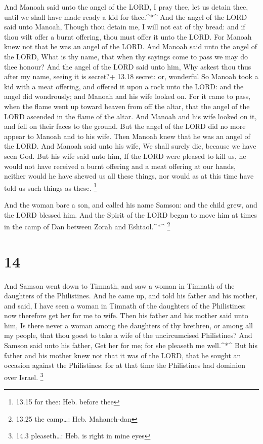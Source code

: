  And Manoah said unto the angel of the LORD, I pray thee,
let us detain thee, until we shall have made ready a kid for
thee.\^{}*\^{}  And the angel of the LORD said unto Manoah,
Though thou detain me, I will not eat of thy bread: and if thou wilt
offer a burnt offering, thou must offer it unto the LORD. For Manoah
knew not that he was an angel of the LORD.  And Manoah said
unto the angel of the LORD, What is thy name, that when thy sayings come
to pass we may do thee honour?  And the angel of the LORD
said unto him, Why askest thou thus after my name, seeing it is secret?+
13.18 secret: or, wonderful  So Manoah took a kid with a
meat offering, and offered it upon a rock unto the LORD: and the angel
did wondrously; and Manoah and his wife looked on.  For it
came to pass, when the flame went up toward heaven from off the altar,
that the angel of the LORD ascended in the flame of the altar. And
Manoah and his wife looked on it, and fell on their faces to the ground.
 But the angel of the LORD did no more appear to Manoah and
to his wife. Then Manoah knew that he was an angel of the LORD.
 And Manoah said unto his wife, We shall surely die,
because we have seen God.  But his wife said unto him, If
the LORD were pleased to kill us, he would not have received a burnt
offering and a meat offering at our hands, neither would he have shewed
us all these things, nor would as at this time have told us such things
as these. \footnote{13.15 for thee: Heb. before thee}

 And the woman bare a son, and called his name Samson: and
the child grew, and the LORD blessed him.  And the Spirit
of the LORD began to move him at times in the camp of Dan between Zorah
and Eshtaol.\^{}*\^{} \footnote{13.25 the camp\ldots: Heb. Mahaneh-dan}

\hypertarget{section-13}{%
\section{14}\label{section-13}}

 And Samson went down to Timnath, and saw a woman in Timnath
of the daughters of the Philistines.  And he came up, and
told his father and his mother, and said, I have seen a woman in Timnath
of the daughters of the Philistines: now therefore get her for me to
wife.  Then his father and his mother said unto him, Is
there never a woman among the daughters of thy brethren, or among all my
people, that thou goest to take a wife of the uncircumcised Philistines?
And Samson said unto his father, Get her for me; for she pleaseth me
well.\^{}*\^{}  But his father and his mother knew not that
it was of the LORD, that he sought an occasion against the Philistines:
for at that time the Philistines had dominion over Israel. \footnote{14.3
  pleaseth\ldots: Heb. is right in mine eyes}

